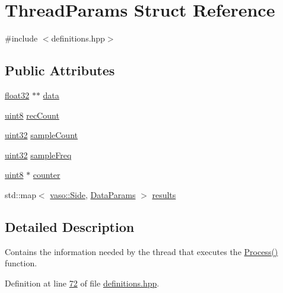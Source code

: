 \hypertarget{structThreadParams}{\section{Thread\+Params Struct Reference}
\label{structThreadParams}
}


{\ttfamily \#include $<$definitions.\+hpp$>$}

\subsection*{Public Attributes}
\begin{DoxyCompactItemize}
\item 
\hyperlink{definitions_8hpp_aacdc525d6f7bddb3ae95d5c311bd06a1}{float32} $\ast$$\ast$ \hyperlink{structThreadParams_a94da463ea449a9fe597b442be56844b9}{data}
\item 
\hyperlink{definitions_8hpp_adde6aaee8457bee49c2a92621fe22b79}{uint8} \hyperlink{structThreadParams_a02e6a905a01a79e8b73fbe21318f82b0}{rec\+Count}
\item 
\hyperlink{definitions_8hpp_a1134b580f8da4de94ca6b1de4d37975e}{uint32} \hyperlink{structThreadParams_ad953eac404cb1fe5057bb6e8fd8bf63f}{sample\+Count}
\item 
\hyperlink{definitions_8hpp_a1134b580f8da4de94ca6b1de4d37975e}{uint32} \hyperlink{structThreadParams_a4c35a854b35945bda8ce13c01123e420}{sample\+Freq}
\item 
\hyperlink{definitions_8hpp_adde6aaee8457bee49c2a92621fe22b79}{uint8} $\ast$ \hyperlink{structThreadParams_aa23fd1fa0f6a8d38cb42d8ee852bc6a6}{counter}
\item 
std\+::map$<$ \hyperlink{namespacevaso_a77c5d9704657d49d456f691ddd8abf7c}{vaso\+::\+Side}, \hyperlink{structDataParams}{Data\+Params} $>$ \hyperlink{structThreadParams_a2332b920eca7ca1fa61cc078e99e0668}{results}
\end{DoxyCompactItemize}


\subsection{Detailed Description}
Contains the information needed by the thread that executes the \hyperlink{namespacevaso_a852067e19b0bcfebb4fa6674c7c8d67f}{Process()} function. 

Definition at line \hyperlink{definitions_8hpp_source_l00072}{72} of file \hyperlink{definitions_8hpp_source}{definitions.\+hpp}.



